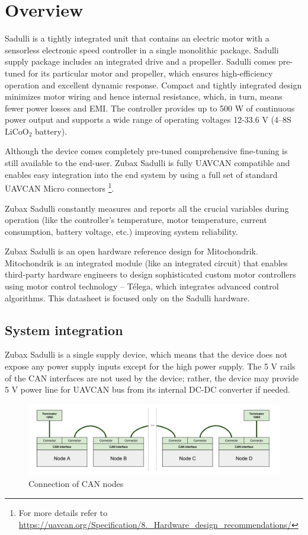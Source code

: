 \chapter{Overview}

Sadulli is a tightly integrated unit that contains an electric motor with a sensorless electronic speed controller
in a single monolithic package. Sadulli supply package includes an integrated drive and a propeller.
Sadulli comes pre-tuned for its particular motor and propeller,
which ensures high-efficiency operation and excellent dynamic response.
Compact and tightly integrated design minimizes motor wiring and hence internal resistance, which, in turn,
means fewer power losses and EMI.
The controller provides up to 500 W of continuous power output and supports a wide range of operating voltages
12-33.6 V (4–8S $\text{LiCoO}_\text{2}$ battery).

Although the device comes completely pre-tuned comprehensive fine-tuning is still available to the end-user.
Zubax Sadulli is fully UAVCAN compatible and enables easy integration into the end system by
using a full set of standard UAVCAN Micro connectors
\footnote{For more details refer to \url{https://uavcan.org/Specification/8._Hardware_design_recommendations/}}.

Zubax Sadulli constantly measures and reports all the crucial variables during operation
(like the controller’s temperature, motor temperature, current consumption, battery voltage, etc.)
improving system reliability.

Zubax Sadulli is an open hardware reference design for Mitochondrik.
Mitochondrik is an integrated module (like an integrated circuit) that enables third-party hardware engineers
to design sophisticated custom motor controllers using motor control technology – T\'elega,
which integrates advanced control algorithms. This datasheet is focused only on the Sadulli hardware.

\section{System integration}
Zubax Sadulli is a single supply device, which means that the device does not expose any power supply inputs
except for the high power supply. The 5 V rails of the CAN interfaces are not used by the device;
rather, the device may provide 5 V power line for UAVCAN bus from its internal DC-DC converter if needed.

\begin{figure}[h]
    \centering
    \includegraphics[width=1\textwidth]{figures/can_integration.png}
    \caption{Connection of CAN nodes}
\end{figure}

